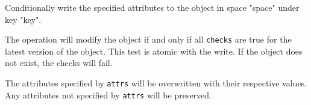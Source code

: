 Conditionally write the specified attributes to the object in space "space" under key "key".

The operation will modify the object if and only if all \texttt{checks} are true
for the latest version of the object.  This test is atomic with the write.  If
the object does not exist, the checks will fail.

The attributes specified by \texttt{attrs} will be overwritten with their
respective values.  Any attributes not specified by \texttt{attrs} will be
preserved.




